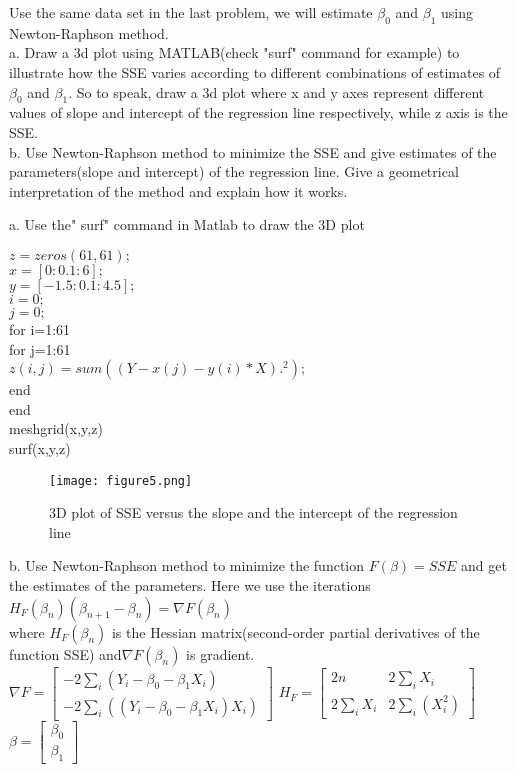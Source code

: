 \documentclass[12pt]{article}
\begin{document}
 {
 Use the same data set in the last problem, we will estimate
 $\beta_0$ and $\beta_1$ using Newton-Raphson method.\\
 a. Draw a 3d plot using MATLAB(check "surf" command for example) to
 illustrate how the SSE varies according to different combinations
 of estimates of $\beta_0$ and $\beta_1$. So to speak, draw a 3d
 plot where x and y axes represent different values of slope and
 intercept of the regression line respectively, while z axis is the
 SSE.\\
 b. Use Newton-Raphson method to minimize the SSE and give estimates
 of the parameters(slope and intercept) of the regression line. Give
 a geometrical interpretation of the method and explain how it
 works.
  }
 { \vfill
  \answer
} { 
a. Use the" surf" command in Matlab to draw the 3D plot 

$z=zeros(61,61);$\\
$x=[0:0.1:6];$\\
$y=[-1.5:0.1:4.5];$\\
$i=0;$\\
$j=0;$\\
for i=1:61\\
    for j=1:61\\
    $z(i,j)=sum((Y-x(j)-y(i)*X).^2);$\\
    end\\
end\\
meshgrid(x,y,z)\\
surf(x,y,z)\\
\begin{figure}[h!]
\centering
\graphicspath{{c:/users/qun/desktop/}}
\texttt{[image: figure5.png]}
\caption{3D plot of SSE versus the slope and the intercept of the regression line }
\end{figure}

 b. Use Newton-Raphson method to minimize the function $F(\beta)=SSE$ and get the estimates of the parameters. Here we use the iterations $H_F(\beta_n)(\beta_{n+1}-\beta_n)=\nabla F(\beta_n)$\\
where $H_F(\beta_n)$ is the Hessian matrix(second-order partial derivatives of the function SSE) and$\nabla F(\beta_n)$ is gradient.\\
$\nabla F= \begin{bmatrix} -2\sum_i(Y_i-\beta_0-\beta_1 X_i) \\
 -2\sum_i ((Y_i-\beta_0-\beta_1 X_i)X_i) \end{bmatrix}$
$H_F= \begin{bmatrix} 2n& 2\sum_i X_i\\
2\sum_i X_i & 2\sum_i(X_i^2) \end{bmatrix}$
$\beta=\begin{bmatrix}\beta_0\\
\beta_1\end{bmatrix}$\\
 
}
\end{document}
